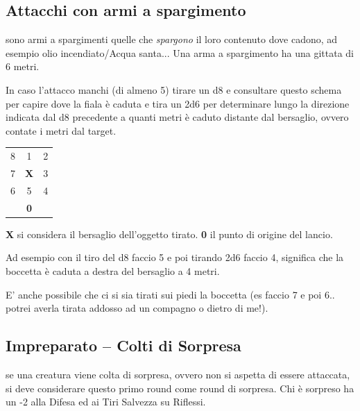 \begin{multicols}{2}
\subsection{Attacchi con armi a spargimento} \label{attacchiarmidaspargimento}\hypertarget{spargimento}{}

sono armi a spargimenti quelle che \emph{spargono} il loro contenuto dove cadono, ad esempio olio incendiato/Acqua santa... Una arma a spargimento ha una gittata di 6 metri.

In caso l'attacco manchi (di almeno 5) tirare un d8 e consultare questo schema per capire dove la fiala è caduta e tira un 2d6 per determinare lungo la direzione indicata dal d8 precedente a quanti metri è caduto distante dal bersaglio, ovvero contate i metri dal target.

\medskip
\begin{center}

\begin{tabular}{ccc}
 8& 1& 2\\
 \rowcolor{gray!20}	7 &\textbf{X}& 3\\
 6 &5 &4\\
	&\textbf{0}&
\end{tabular}
\end{center}

\smallskip

\textbf{X} si considera il bersaglio dell'oggetto tirato. \textbf{0} il punto di origine del lancio.

Ad esempio con il tiro del d8 faccio 5 e poi tirando 2d6 faccio 4, significa che la boccetta è caduta a destra del bersaglio a 4 metri.

E' anche possibile che ci si sia tirati sui piedi la boccetta (es faccio 7 e poi 6.. potrei averla tirata addosso ad un compagno o dietro di me!).

\subsection{Impreparato -- Colti di Sorpresa}\label{coltidisorpresa}\hypertarget{sorpresa}{}

se una creatura viene colta di sorpresa, ovvero non si aspetta di essere attaccata, si deve considerare questo primo round come round di sorpresa. Chi è sorpreso ha un -2 alla Difesa ed ai Tiri Salvezza su Riflessi.


\end{multicols}
